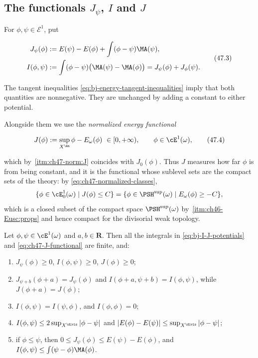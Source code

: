 \subsection{The functionals \texorpdfstring{$J_\psi$}{J psi},
\texorpdfstring{$I$}{I} and \texorpdfstring{$J$}{J}}
\label{sec:ch47-three-functionals}

For $\phi,\psi\in\mathcal E^1$, put

\[
 \begin{split}
 J_\psi(\phi)&:=E(\psi)-E(\phi)
                  +\int(\phi-\psi)\MA(\psi),\\
 I(\phi,\psi)&:=\int(\phi-\psi)
                    \bigl(\MA(\psi)-\MA(\phi)\bigr)
               =J_\psi(\phi)+J_\phi(\psi).
 \end{split}
\tag{47.3}\label{eq:bj-I-J-potentials}
\]

The tangent inequalities \eqref{eq:bj-energy-tangent-inequalities} imply
that both quantities are nonnegative.  They are unchanged by adding a constant to either potential.

Alongside them we use the \emph{normalized energy functional}

\[
 J(\phi):=\sup_{X^{\An}}\phi-E_\omega(\phi)
 \ \in[0,+\infty),
 \qquad\phi\in\cE^1(\omega),
\tag{47.4}\label{eq:ch47-J-functional}
\]

which by \,\cref{itm:ch47-norm:J}
coincides with $J_0(\phi)$.  Thus $J$ measures how far $\phi$ is from
being constant, and it is the functional whose sublevel sets are the
compact sets of the theory: by \eqref{eq:ch47-normalized-classes},
\[
 \{\phi\in\cE^1_0(\omega)\mid J(\phi)\le C\}
 =\{\phi\in\PSH^{\sup}(\omega)\mid E_\omega(\phi)\ge-C\},
\]
which is a closed subset of the compact space $\PSH^{\sup}(\omega)$ by
\,\cref{itm:ch46-Eusc:props} and hence compact for the divisorial weak topology.

\begin{lemma}
\label{lem:ch47-IJ-elementary}
Let $\phi,\psi\in\cE^1(\omega)$ and $a,b\in\mathbf R$.  Then all the
integrals in \eqref{eq:bj-I-J-potentials} and
\eqref{eq:ch47-J-functional} are finite, and:
\begin{enumerate}
\item\label{itm:ch47-IJ:nonneg}
      $J_\psi(\phi)\ge0$, $I(\phi,\psi)\ge0$, $J(\phi)\ge0$;
\item\label{itm:ch47-IJ:translation}
      $J_{\psi+b}(\phi+a)=J_\psi(\phi)$ and
      $I(\phi+a,\psi+b)=I(\phi,\psi)$, while $J(\phi+a)=J(\phi)$;
\item\label{itm:ch47-IJ:symmetry}
      $I(\phi,\psi)=I(\psi,\phi)$, and $I(\phi,\phi)=0$;
\item\label{itm:ch47-IJ:sup}
      $I(\phi,\psi)\le2\sup_{X^{\divis}}|\phi-\psi|$ and
      $|E(\phi)-E(\psi)|\le\sup_{X^{\divis}}|\phi-\psi|$;
\item\label{itm:ch47-IJ:monotone}
      if $\phi\le\psi$, then
      $0\le J_\psi(\phi)\le E(\psi)-E(\phi)$,
      and $I(\phi,\psi)\le\int(\psi-\phi)\MA(\phi)$.
\end{enumerate}
\end{lemma}

